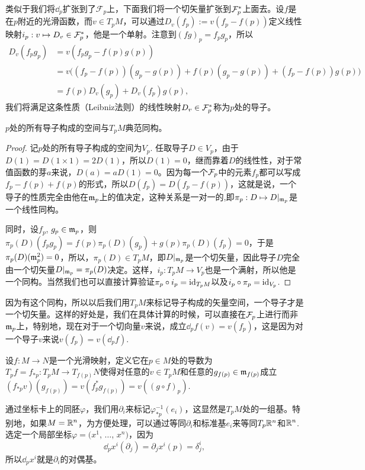 类似于我们将$\dd_p$扩张到了$\mathcal{F}_p$上，下面我们将一个切矢量扩张到$\mathcal{F}_p^*$上面去。设$f$是在$p$附近的光滑函数，而$v\in T_pM$，可以通过$D_v(f_p):=v(f_p-f(p))$定义线性映射$i_p:v\mapsto D_v\in \mathcal{F}_p^*$，他是一个单射。注意到$(fg)_p=f_pg_p$，所以
\[
	\begin{aligned}
		D_v(f_pg_p)&=v(f_pg_p-f(p)g(p))\\
		&=v\bigl((f_p-f(p))(g_p-g(p))+f(p)(g_p-g(p))+(f_p-f(p))g(p)\bigr)\\
		&=f(p)D_v(g_p)+D_v(f_p)g(p),
	\end{aligned}
\]
我们将满足这条性质（Leibniz法则）的线性映射$D_v\in \mathcal{F}_p^*$称为$p$处的导子。

\begin{lem}
$p$处的所有导子构成的空间与$T_pM$典范同构。
\end{lem}

\begin{proof}
记$p$处的所有导子构成的空间为$V_p$. 任取导子$D\in V_p$，由于$D(1)=D(1\times 1)=2D(1)$，所以$D(1)=0$，继而靠着$D$的线性性，对于常值函数的芽$a$来说，$D(a)=aD(1)=0$。因为每一个$\mathcal{F}_p$中的元素$f_p$都可以写成$f_p-f(p)+f(p)$的形式，所以$D(f_p)=D(f_p-f(p))$，这就是说，一个导子的性质完全由他在$\mathfrak{m}_p$上的值决定，这种关系是一对一的,即$\pi_p:D\mapsto D|_{\mathfrak{m}_p}$是一个线性同构。

同时，设$f_p$, $g_p\in \mathfrak{m}_p$，则$\pi_p(D)(f_pg_p)=f(p)\pi_p(D)(g_p)+g(p)\pi_p(D)(f_p)=0$，于是$\pi_p(D)(\mathfrak{m}_p^2)=0$，所以，$\pi_p(D)\in T_pM$，即$D|_{\mathfrak{m}_p}$是一个切矢量，因此导子$D$完全由一个切矢量$D|_{\mathfrak{m}_p}=\pi_p(D)$决定。这样，$i_p:T_pM\to V_p$也是一个满射，所以他是一个同构。当然我们也可以直接计算验证$\pi_p\circ i_p=\operatorname{id}_{T_pM}$以及$i_p\circ \pi_p=\operatorname{id}_{V_p}$.
\end{proof}

因为有这个同构，所以以后我们用$T_pM$来标记导子构成的矢量空间，一个导子才是一个切矢量。这样的好处是，我们在具体计算的时候，可以直接在$\mathcal{F}_p$上进行而非$\mathfrak{m}_p$上，特别地，现在对于一个切向量$v$来说，成立$\dd_pf(v)=v(f_p)$，这是因为对一个导子$v$来说$v(f_p)=v(\dd_pf)$.

\begin{para}[推前映射]
设$f:M\to N$是一个光滑映射，定义它在$p\in M$处的导数为$T_pf=f_{*p}:T_pM\to T_{f(p)}N$使得对任意的$v\in T_p M$和任意的$g_{f(p)}\in \mathfrak{m}_{f(p)}$成立$(f_{*p}v)(g_{f(p)})=v(f_p^*g_{f(p)})=v((g\circ f)_p)$.
\end{para}

通过坐标卡上的同胚$\varphi$，我们用$\partial_i$来标记$\varphi^{-1}_{*p}(e_i)$，这显然是$T_pM$处的一组基。特别地，如果$M=\mathbb{R}^n$，为方便处理，可以通过等同$\partial_i$和标准基$e_i$来等同$T_p\mathbb{R}^n$和$\mathbb{R}^n$. 选定一个局部坐标$\varphi=(x^1$, $\dots$, $x^n)$，因为
\[
	\dd_p x^i(\partial_j)=\partial_jx^i(p)=\delta^i_j,
\]
所以$\dd_p x^i$就是$\partial_i$的对偶基。


